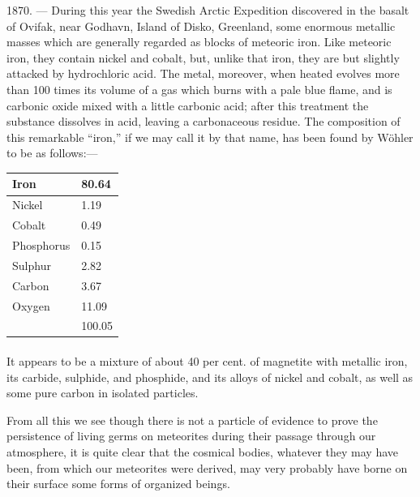 \documentclass[a4paper, 11pt, oneside, english]{article}
\begin{document}
1870. --- During this year the Swedish Arctic Expedition discovered in the basalt of Ovifak, near Godhavn, Island of Disko, Greenland, some enormous metallic masses which are generally regarded as blocks of meteoric iron. Like meteoric iron, they contain nickel and cobalt, but, unlike that iron, they are but slightly attacked by hydrochloric acid. The metal, moreover, when heated evolves more than 100 times its volume of a gas which burns with a pale blue flame, and is carbonic oxide mixed with a little carbonic acid; after this treatment the substance dissolves in acid, leaving a carbonaceous residue. The composition of this remarkable ``iron,'' if we may call it by that name, has been found by Wöhler to be as follows:---
\begin{table}[H]
    \centering
    \begin{tabular}{|l|l|}
    \hline
        Iron & 80.64 \\ \hline
        Nickel & 1.19 \\ \hline
        Cobalt & 0.49 \\ \hline
        Phosphorus & 0.15 \\ \hline
        Sulphur & 2.82 \\ \hline
        Carbon & 3.67 \\ \hline
        Oxygen & 11.09 \\ \hline
        ~ & 100.05 \\ \hline
    \end{tabular}
\end{table}
\paragraph{}
It appears to be a mixture of about 40 per cent. of magnetite with metallic iron, its carbide, sulphide, and phosphide, and its alloys of nickel and cobalt, as well as some pure carbon in isolated particles.

From all this we see though there is not a particle of evidence to prove the persistence of living germs on meteorites during their passage through our atmosphere, it is quite clear that the cosmical bodies, whatever they may have been, from which our meteorites were derived, may very probably have borne on their surface some forms of organized beings.
\end{document}
